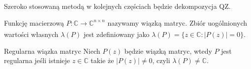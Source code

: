 


Szeroko stosowaną metodą w kolejnych częściach będzie dekompozycja QZ. 

\begin{defi}
    Funkcję macierzową $P: \mathbb{C} \xrightarrow[]{} \mathbb{C}^{n \times n}$ nazywamy wiązką matryc. Zbiór uogólnionych wartości własnych $\lambda(P)$ jest zdefiniowany jako $\lambda(P) = \{ z \in \mathbb{C}: |P(z)| = 0\}$.
\end{defi}

\begin{defi}{Regularna wiązka matryc}
    Niech $P(z)$ będzie wiązką matryc, wtedy $P$ jest regularna jeśli istnieje $z \in \mathbb{C}$ takie że $|P(z)| \neq 0$, czyli $\lambda(P) \neq \mathbb{C}$.
\end{defi}

